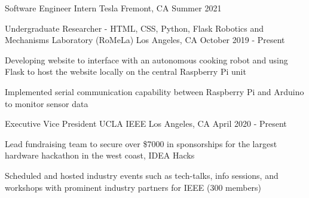 \documentclass[12pt, letterpaper]{awesome-cv}
\begin{document}
\begin{cventries}
  \cventry
    {Software Engineer Intern} %
    {Tesla} %
    {Fremont, CA} %
    {Summer 2021} %
    {
    }
  \vspace{-0.07in}

  \cventry
    {Undergraduate Researcher - HTML, CSS, Python, Flask} %
    {Robotics and Mechanisms Laboratory (RoMeLa)} %
    {Los Angeles, CA} %
    {October 2019 - Present} %
    {
      \begin{cvitems} %
        \item {Developing website to interface with an autonomous cooking robot and using Flask to host the website locally on the central Raspberry Pi unit}
        \item {Implemented serial communication capability between Raspberry Pi and Arduino to monitor sensor data}
      \end{cvitems}
    }

\end{cventries}


\begin{cventries}
  \cventry
    {Executive Vice President} %
    {UCLA IEEE} %
    {Los Angeles, CA} %
    {April 2020 - Present} %
    {
      \begin{cvitems} %
        \item {Lead fundraising team to secure over \$7000 in sponsorships for the largest hardware hackathon in the west coast, IDEA Hacks}
        \item {Scheduled and hosted industry events such as tech-talks, info sessions, and workshops with prominent industry partners for IEEE (300 members)}
      \end{cvitems}
    }
\end{cventries}
\end{document}
